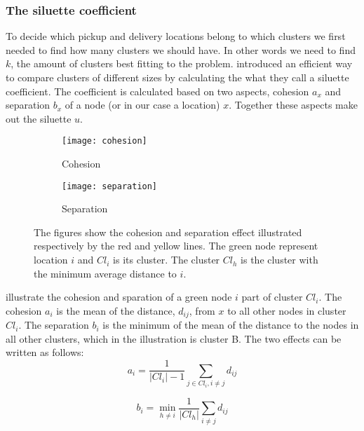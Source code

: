 \documentclass[../main.tex]{subfiles}
\begin{document}
\subsubsection{The siluette coefficient}
To decide which pickup and delivery locations belong to which clusters we first needed to find how many clusters we should have. 
In other words we need to find $k$, the amount of clusters best fitting to the problem. 
\cite{kaufman90} introduced an efficient way to compare clusters of different sizes by calculating the what they call a siluette coefficient.
The coefficient is calculated based on two aspects, cohesion $a_x$ and separation $b_x$ of a node (or in our case a location) $x$. 
Together these aspects make out the siluette $u$.
\begin{figure}
\centering
    \begin{subfigure}[b]{0.35\textwidth}
        \centering
        \texttt{[image: cohesion]}
        \caption{Cohesion}
        \label{fig:cohesion}
    \end{subfigure}
    \hfill
    \begin{subfigure}[b]{0.60\textwidth}
        \centering
        \texttt{[image: separation]}
        \caption{Separation}
        \label{fig:separation}
    \end{subfigure}
    \label{fig:silu}
    \caption{The figures show the cohesion and separation effect illustrated respectively by the red and yellow lines. The green node represent location $i$ and $Cl_i$ is its cluster. The cluster $Cl_h$ is the cluster with the minimum average distance to $i$. }
\end{figure}


 illustrate the cohesion and sparation of a green node $i$ part of cluster $Cl_i$. 
The cohesion $a_i$ is the mean of the distance, $d_{ij}$, from $x$ to all other nodes in cluster $Cl_i$. The separation $b_i$ is the minimum of the mean of the distance to the nodes in all other clusters, which in the illustration is cluster B.
The two effects can be written as follows:
\begin{equation}
    \label{eq:cohesion}
    a_i = \dfrac{1}{|Cl_i|-1}\sum_{j\in Cl_i, i\neq j}{d_{ij}}
\end{equation}

\begin{equation}
    \label{eq:cohesion}
    b_i = \min_{h\neq i} \dfrac{1}{|Cl_h|}\sum_{i\neq j}{d_{ij}}
\end{equation}
\end{document}
